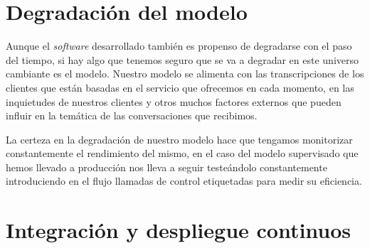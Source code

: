 \section{Degradación del modelo}
\label{section:mant:efi}
Aunque el \textit{software} desarrollado también es propenso de degradarse con el paso del tiempo, si hay algo que tenemos seguro que se va a degradar en este universo cambiante es el modelo. Nuestro modelo se alimenta con las transcripciones de los clientes que están basadas en el servicio que ofrecemos en cada momento, en las inquietudes de nuestros clientes y otros muchos factores externos que pueden influir en la temática de las conversaciones que recibimos.

La certeza en la degradación de nuestro modelo hace que tengamos monitorizar constantemente el rendimiento del mismo, en el caso del modelo supervisado que hemos llevado a producción nos lleva a seguir testeándolo constantemente introduciendo en el flujo llamadas de control etiquetadas para medir su eficiencia.  




\section{Integración y despliegue continuos}
\label{section:mant:cicd}
